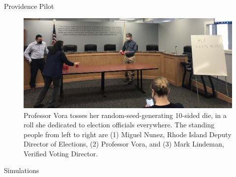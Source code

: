 \documentclass[final]{beamer}
\newlength{\colwidth}
\begin{document}
\begin{frame}[t]
\begin{columns}[t]
\begin{column}{\colwidth}
\begin{block}{Providence Pilot}
\begin{figure}
\includegraphics[width=1.0\textwidth]{dice.jpg}
\caption{
Professor Vora tosses her random-seed-generating 10-sided die, in a roll she dedicated to election officials everywhere.
The standing people from left to right are (1) Miguel Nunez, Rhode Island Deputy Director of Elections, 
(2) Professor Vora, and (3) Mark Lindeman, Verified Voting Director.
}
\end{figure}

\end{block}

\begin{block}{Simulations}


\end{block}
\end{column}
\end{columns}
\end{frame}
\end{document}

